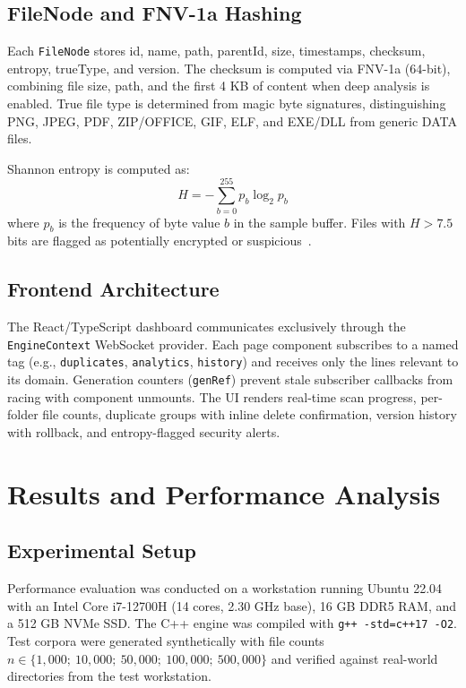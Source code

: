 \documentclass[conference]{IEEEtran}
\begin{document}
\subsection{FileNode and FNV-1a Hashing}

Each \texttt{FileNode} stores id, name, path, parentId, size, timestamps, checksum, entropy, trueType, and version. The checksum is computed via FNV-1a (64-bit), combining file size, path, and the first 4 KB of content when deep analysis is enabled. True file type is determined from magic byte signatures, distinguishing PNG, JPEG, PDF, ZIP/OFFICE, GIF, ELF, and EXE/DLL from generic DATA files.

Shannon entropy is computed as:
\begin{equation}
H = -\sum_{b=0}^{255} p_b \log_2 p_b
\label{eq:entropy}
\end{equation}
where $p_b$ is the frequency of byte value $b$ in the sample buffer. Files with $H > 7.5$ bits are flagged as potentially encrypted or suspicious~\cite{idika2007survey}.

\subsection{Frontend Architecture}

The React/TypeScript dashboard communicates exclusively through the \texttt{EngineContext} WebSocket provider. Each page component subscribes to a named tag (e.g., \texttt{duplicates}, \texttt{analytics}, \texttt{history}) and receives only the lines relevant to its domain. Generation counters (\texttt{genRef}) prevent stale subscriber callbacks from racing with component unmounts. The UI renders real-time scan progress, per-folder file counts, duplicate groups with inline delete confirmation, version history with rollback, and entropy-flagged security alerts.

\section{Results and Performance Analysis}
\label{sec:results}

\subsection{Experimental Setup}

Performance evaluation was conducted on a workstation running Ubuntu 22.04 with an Intel Core i7-12700H (14 cores, 2.30 GHz base), 16 GB DDR5 RAM, and a 512 GB NVMe SSD. The C++ engine was compiled with \texttt{g++ -std=c++17 -O2}. Test corpora were generated synthetically with file counts $n \in \{1{,}000;\ 10{,}000;\ 50{,}000;\ 100{,}000;\ 500{,}000\}$ and verified against real-world directories from the test workstation.
\end{document}
